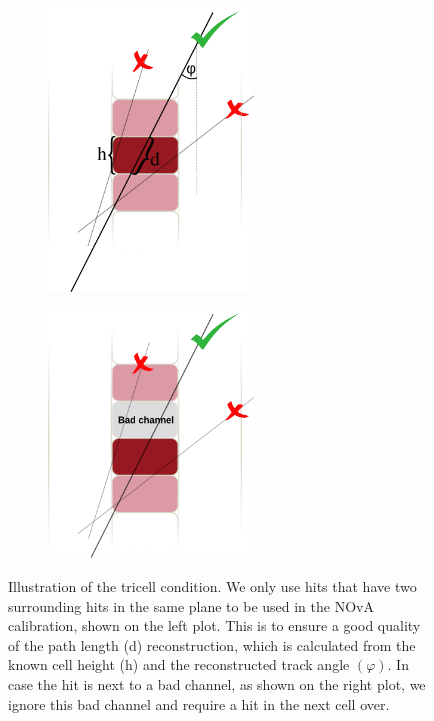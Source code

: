 \begin{figure}[hbtp]
\centering
\begin{subfigure}[b]{0.49\textwidth}
\centering
\includegraphics[width=0.6\textwidth]{Plots/NOvAExperiment/TricellConditionWithDescription.png}
\end{subfigure}
\begin{subfigure}[b]{0.49\textwidth}
\centering
\includegraphics[width=0.6\textwidth]{Plots/NOvAExperiment/TricellConditionWithBadChannel.png}
\end{subfigure}
\caption[Tricell condition for calibration hits in NOvA]{Illustration of the tricell condition. We only use hits that have two surrounding hits in the same plane to be used in the \acrshort{NOvA} calibration, shown on the left plot. This is to ensure a good quality of the path length (d) reconstruction, which is calculated from the known cell height (h) and the reconstructed track angle $\left(\varphi\right)$. In case the hit is next to a bad channel, as shown on the right plot, we ignore this bad channel and require a hit in the next cell over.}
\label{fig:NOvATricellCondition}
\end{figure}

